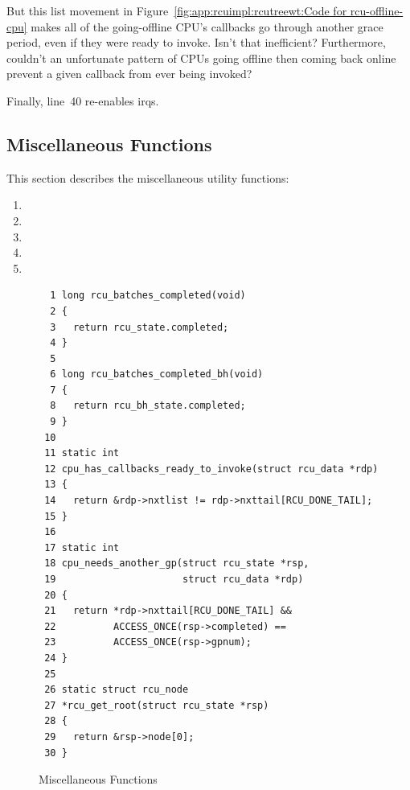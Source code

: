 \QuickQuiz{}
	But this list movement in
	Figure~\ref{fig:app:rcuimpl:rcutreewt:Code for rcu-offline-cpu}
	makes all of the going-offline CPU's callbacks go through
	another grace period, even if they were ready to invoke.
	Isn't that inefficient?
	Furthermore, couldn't an unfortunate pattern of CPUs going
	offline then coming back online prevent a given callback from
	ever being invoked?
 \QuickQuizEnd

Finally, line~40 re-enables irqs.

\subsection{Miscellaneous Functions}
\label{app:rcuimpl:rcutreewt:Miscellaneous Functions}

This section describes the miscellaneous utility functions:
\begin{enumerate}
\item	{}
\item	{}
\item	{}
\item	{}
\item	{}
\end{enumerate}

\begin{figure}[tbp]
{ \scriptsize
\begin{verbatim}
  1 long rcu_batches_completed(void)
  2 {
  3   return rcu_state.completed;
  4 }
  5
  6 long rcu_batches_completed_bh(void)
  7 {
  8   return rcu_bh_state.completed;
  9 }
 10
 11 static int
 12 cpu_has_callbacks_ready_to_invoke(struct rcu_data *rdp)
 13 {
 14   return &rdp->nxtlist != rdp->nxttail[RCU_DONE_TAIL];
 15 }
 16
 17 static int
 18 cpu_needs_another_gp(struct rcu_state *rsp,
 19                      struct rcu_data *rdp)
 20 {
 21   return *rdp->nxttail[RCU_DONE_TAIL] &&
 22          ACCESS_ONCE(rsp->completed) ==
 23          ACCESS_ONCE(rsp->gpnum);
 24 }
 25
 26 static struct rcu_node
 27 *rcu_get_root(struct rcu_state *rsp)
 28 {
 29   return &rsp->node[0];
 30 }
\end{verbatim}
}
\caption{Miscellaneous Functions}
\label{fig:app:rcuimpl:rcutreewt:Miscellaneous Functions}
\end{figure}

